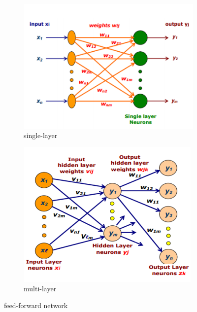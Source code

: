 \documentclass[12pt, a4paper, twoside]{report}
\begin{document}
\begin{figure}[ht]
    \centering
    \begin{subfigure}[b]{0.48\textwidth}
        \includegraphics[width=\textwidth]
        {images/chapter4/forward-single}
        \caption{single-layer}
        \label{fig:forward-single}
    \end{subfigure}
    \hfill
    \begin{subfigure}[b]{0.48\textwidth}
        \includegraphics[width=\textwidth]
        {images/chapter4/forward-multi}
        \caption{multi-layer}
        \label{fig:forward-multi}
    \end{subfigure}
    \caption{feed-forward network}
    \label{fig:feed-forward}
\end{figure}
\end{document}
